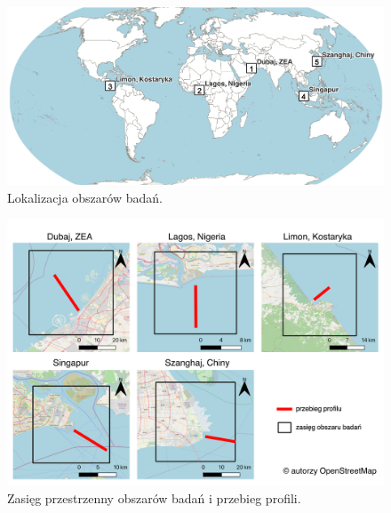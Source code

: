 \documentclass{amuthesis}
\begin{document}
\begin{figure}[t]

{\centering \includegraphics[width=1\textwidth,height=\textheight]{figures/aois3.png}

}

\caption{\label{fig-aois}Lokalizacja obszarów badań.}

\end{figure}

\begin{figure}[t]

{\centering \includegraphics[width=1\textwidth,height=\textheight]{figures/aois_profiles.png}

}

\caption{\label{fig-aois_profiles}Zasięg przestrzenny obszarów badań i
przebieg profili.}

\end{figure}
\end{document}
